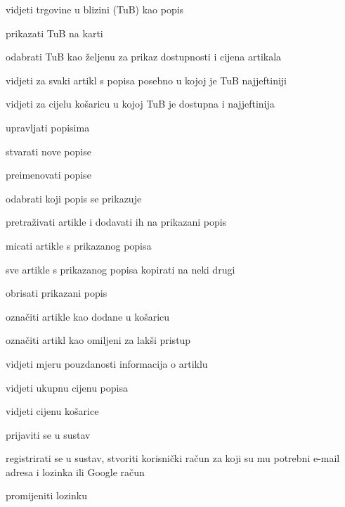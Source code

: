 			
			\begin{packed_enum}
				\item  {}
				
				\begin{packed_enum}
					
					\item vidjeti trgovine u blizini (TuB) kao popis
					\item prikazati TuB na karti
					\item odabrati TuB kao željenu za prikaz dostupnosti i cijena artikala
					\item vidjeti za svaki artikl s popisa posebno u kojoj je TuB najjeftiniji
					\item vidjeti za cijelu košaricu u kojoj TuB je dostupna i najjeftinija
					\item upravljati popisima
					\begin{packed_enum}
						
						\item stvarati nove popise
						\item preimenovati popise
						\item odabrati koji popis se prikazuje
						\item pretraživati artikle i dodavati ih na prikazani popis
						\item micati artikle s prikazanog popisa
						\item sve artikle s prikazanog popisa kopirati na neki drugi
						\item obrisati prikazani popis
						\item označiti artikle kao dodane u košaricu 
				
					\end{packed_enum}
					\item označiti artikl kao omiljeni za lakši pristup
					\item vidjeti mjeru pouzdanosti informacija o artiklu
					\item vidjeti ukupnu cijenu popisa
					\item vidjeti cijenu košarice
					\begin{packed_enum}
					    \item prijaviti se u sustav
					    \item registrirati se u sustav, stvoriti korisnički račun za koji su mu potrebni e-mail adresa i lozinka ili Google račun
					    \item promijeniti lozinku
					\end{packed_enum}
					

\end{packed_enum}
\end{packed_enum}

